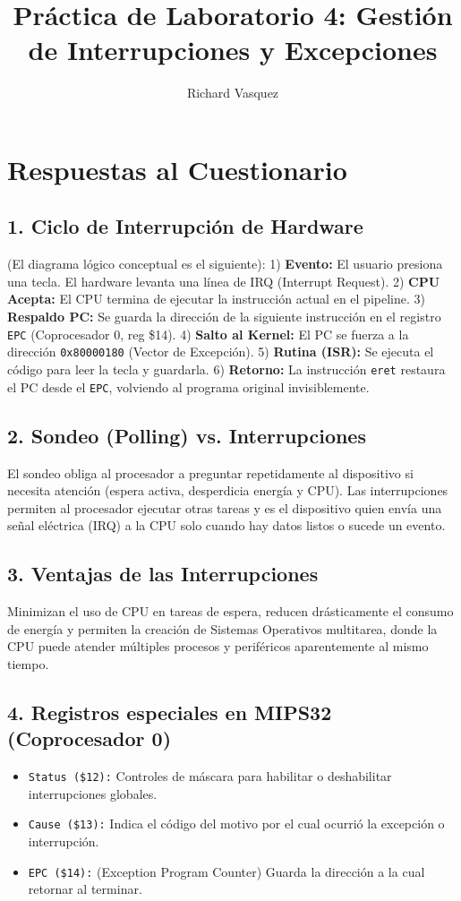 \documentclass[12pt, a4paper]{article}
\title{Práctica de Laboratorio 4: Gestión de Interrupciones y Excepciones}
\author{Richard Vasquez}
\begin{document}
\maketitle

\section{Respuestas al Cuestionario}

\subsection{1. Ciclo de Interrupción de Hardware}
(El diagrama lógico conceptual es el siguiente):
1) \textbf{Evento:} El usuario presiona una tecla. El hardware levanta una línea de IRQ (Interrupt Request).
2) \textbf{CPU Acepta:} El CPU termina de ejecutar la instrucción actual en el pipeline.
3) \textbf{Respaldo PC:} Se guarda la dirección de la siguiente instrucción en el registro \texttt{EPC} (Coprocesador 0, reg \$14).
4) \textbf{Salto al Kernel:} El PC se fuerza a la dirección \texttt{0x80000180} (Vector de Excepción).
5) \textbf{Rutina (ISR):} Se ejecuta el código para leer la tecla y guardarla.
6) \textbf{Retorno:} La instrucción \texttt{eret} restaura el PC desde el \texttt{EPC}, volviendo al programa original invisiblemente.

\subsection{2. Sondeo (Polling) vs. Interrupciones}
El sondeo obliga al procesador a preguntar repetidamente al dispositivo si necesita atención (espera activa, desperdicia energía y CPU). Las interrupciones permiten al procesador ejecutar otras tareas y es el dispositivo quien envía una señal eléctrica (IRQ) a la CPU solo cuando hay datos listos o sucede un evento.

\subsection{3. Ventajas de las Interrupciones}
Minimizan el uso de CPU en tareas de espera, reducen drásticamente el consumo de energía y permiten la creación de Sistemas Operativos multitarea, donde la CPU puede atender múltiples procesos y periféricos aparentemente al mismo tiempo.

\subsection{4. Registros especiales en MIPS32 (Coprocesador 0)}
\begin{itemize}
    \item \texttt{Status (\$12):} Controles de máscara para habilitar o deshabilitar interrupciones globales.
    \item \texttt{Cause (\$13):} Indica el código del motivo por el cual ocurrió la excepción o interrupción.
    \item \texttt{EPC (\$14):} (Exception Program Counter) Guarda la dirección a la cual retornar al terminar.
\end{itemize}
\end{document}
